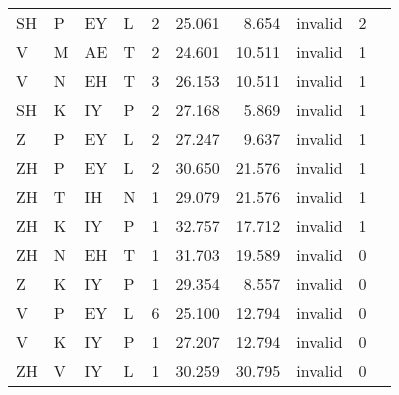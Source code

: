 \begin{longtable}{l@{ } l@{ } l@{ } l r r r r r r}
SH & P  & EY & L  & 2  & 25.061 & 8.654  & invalid & 2 \\
V  & M  & AE & T  & 2  & 24.601 & 10.511 & invalid & 1 \\
V  & N  & EH & T  & 3  & 26.153 & 10.511 & invalid & 1 \\
SH & K  & IY & P  & 2  & 27.168 & 5.869  & invalid & 1 \\
Z  & P  & EY & L  & 2  & 27.247 & 9.637  & invalid & 1 \\
ZH & P  & EY & L  & 2  & 30.650 & 21.576 & invalid & 1 \\
ZH & T  & IH & N  & 1  & 29.079 & 21.576 & invalid & 1 \\
ZH & K  & IY & P  & 1  & 32.757 & 17.712 & invalid & 1 \\
ZH & N  & EH & T  & 1  & 31.703 & 19.589 & invalid & 0 \\
Z  & K  & IY & P  & 1  & 29.354 & 8.557  & invalid & 0 \\
V  & P  & EY & L  & 6  & 25.100 & 12.794 & invalid & 0 \\
V  & K  & IY & P  & 1  & 27.207 & 12.794 & invalid & 0 \\
ZH & V  & IY & L  & 1  & 30.259 & 30.795 & invalid & 0 \\
\bottomrule
\end{longtable}

